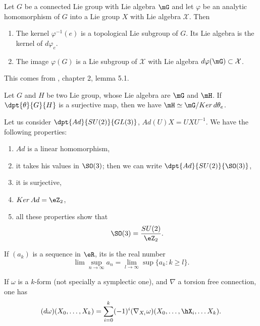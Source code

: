 \begin{lemma}
Let $G$ be a connected Lie group with Lie algebra $\mG$ and let $\varphi$ be an analytic homomorphism of $G$ into a Lie group $X$ with Lie algebra $\mathcal{X}$. Then

\begin{enumerate}
\item The kernel $\varphi^{-1}(e)$ is a topological Lie subgroup of $G$. Its Lie algebra is the kernel of $d\varphi_e$.
\item The image $\varphi(G)$ is a Lie subgroup of $\mathcal{X}$ with Lie algebra $d\varphi(\mG)\subset\mathcal{X}$.
\end{enumerate}
\label{Helgason5.1}
\end{lemma}
This comes from \cite{Helgason}, chapter 2, lemma 5.1.

\begin{lemma}
Let $G$ and $H$ be two Lie group, whose Lie algebra are $\mG$ and $\mH$. If $\dpt{\theta}{G}{H}$ is a surjective map, then we have $\mH\simeq\mG/Ker\,d\theta_e$.
\label{1203r1}
\end{lemma}

\begin{theorem} \label{1503t1}
Let us consider $\dpt{Ad}{SU(2)}{GL(3)}$, $Ad(U)X=UXU^{-1}$. We have the following properties:

\begin{enumerate}
\item $Ad$ is a linear homomorphism,
\item it takes his values in $\SO(3)$; then we can write $\dpt{Ad}{SU(2)}{\SO(3)}$,
\item it is surjective,
\item $Ker\,Ad=\eZ_2$,
\item all these properties show that \[\SO(3)=\frac{SU(2)}{\eZ_2}.\]
\end{enumerate}
\end{theorem}

\begin{definition}
If $(a_k)$ is a sequence in $\eR$, its  is the real number
\[
  \lim\sup_{n\to\infty}a_n=\lim_{l\to\infty}\sup\{a_k:k\geq l\}.
\]
\end{definition}

\begin{lemma}
If $\omega$ is a $k$-form (not specially a symplectic one), and $\nabla$ a torsion free connection, one has
\begin{equation}\label{eq:d_omega_nabla}
  (d\omega)(X_0,\ldots,X_k)=\sum_{i=0}^k (-1)^i(\nabla_{X_i}\omega)(X_0,\ldots,\hX_i,\ldots X_k).
\end{equation}
\end{lemma}

